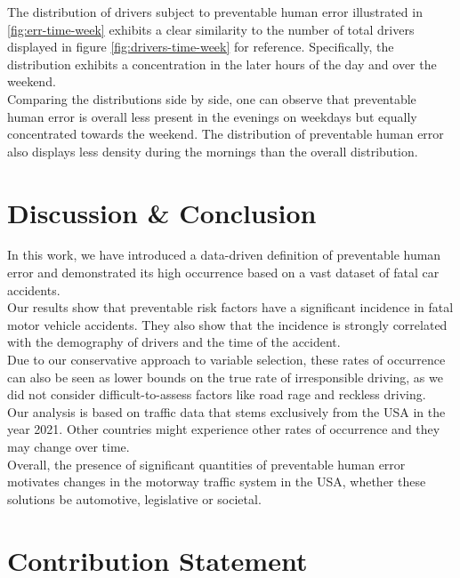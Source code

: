 \documentclass{article}
\theoremstyle{plain}
\theoremstyle{definition}
\theoremstyle{remark}
\begin{document}
\hfill \break
The distribution of drivers subject to preventable human error illustrated in \ref{fig:err-time-week} exhibits a clear similarity to the number of total drivers displayed in figure \ref{fig:drivers-time-week} for reference. Specifically, the distribution exhibits a concentration in the later hours of the day and over the weekend.\\
Comparing the distributions side by side, one can observe that preventable human error is overall less present in the evenings on weekdays but equally concentrated towards the weekend. The distribution of preventable human error also displays less density during the mornings than the overall distribution.
\section{Discussion \& Conclusion}\label{sec:conclusion}

In this work, we have introduced a data-driven definition of preventable human error and demonstrated its high occurrence based on a vast dataset of fatal car accidents.
\\
Our results show that preventable risk factors have a significant incidence in fatal motor vehicle accidents. They also show that the incidence is strongly correlated with the demography of drivers and the time of the accident.
\\
Due to our conservative approach to variable selection, these rates of occurrence can also be seen as lower bounds on the true rate of irresponsible driving, as we did not consider difficult-to-assess factors like road rage and reckless driving.
\\
Our analysis is based on traffic data that stems exclusively from the USA in the year 2021. Other countries might experience other rates of occurrence and they may change over time.
\\
Overall, the presence of significant quantities of preventable human error motivates changes in the motorway traffic system in the USA, whether these solutions be automotive, legislative or societal. 


\section*{Contribution Statement}
\end{document}

